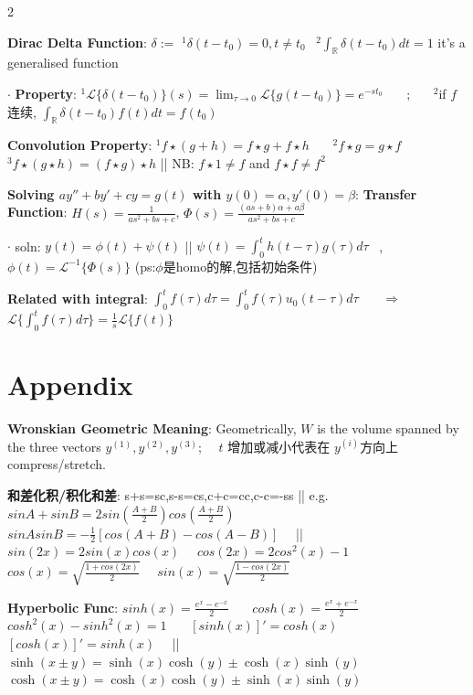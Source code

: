 \documentclass[8pt]{extarticle}
\begin{document}
\begin{multicols}{2}
{\textbf{Dirac Delta Function}: $\delta:=$ $^1\delta(t-t_0)=0,t\ne t_0$ \ $^2\int_{\mathbb{R}}\delta(t-t_0)dt=1$ {\tiny it's a generalised function}

$\cdot$ \textbf{Property}: $^1\mathcal{L}\{\delta(t-t_0)\}(s)=\lim_{\tau\to0}\mathcal{L}\{g(t-t_0)\}=e^{-st_0}$ \ \ \ ; \ \ \ $^2$if $f$连续, $\int_{\mathbb{R}}\delta(t-t_0)f(t)dt=f(t_0)$

\textbf{Convolution Property}: $^1f\star (g+h)=f\star g+f\star h$ \ \ \ $^2f\star g=g\star f$ \ \ \ $^3f\star (g\star h)=(f\star g)\star h$ || NB: $f\star 1\ne f$ and $f\star f\ne f^2$

\vspace{-2pt}
\textbf{Solving $ay''+by'+cy=g(t)$ with $y(0)=\alpha,y'(0)=\beta$}:  \textbf{Transfer Function}: $H(s)=\frac{1}{as^2+bs+c}$, $\Phi(s)=\frac{(as+b)\alpha+a\beta}{as^2+bs+c}$

$\cdot$ soln: $y(t)=\phi(t)+\psi(t)$ || $\psi(t)=\int_{0}^{t}h(t-\tau)g(\tau)d\tau$ \ , \ $\phi(t)=\mathcal{L}^{-1}\{\Phi(s)\}$ (ps:$\phi$是homo的解,包括初始条件)

\textbf{Related with integral}: $\int^t_0f(\tau)d\tau=\int_{0}^{t}f(\tau)u_{0}(t-\tau)d\tau$ \ \ \ $\Rightarrow$ \ \ \ $\mathcal{L}\{\int_{0}^{t}f(\tau)d\tau\}=\frac{1}{s}\mathcal{L}\{f(t)\}$

}
\end{multicols}
\vspace{-10pt}


\section{Appendix}

\scriptsize

\textbf{Wronskian Geometric Meaning}: Geometrically, $W$ is the volume spanned by the three vectors $y^{(1)}, y^{(2)}, y^{(3)}$; \ \ $t$ 增加或减小代表在 $y^{(i)}$方向上 compress/stretch.

\textbf{和差化积/积化和差}: s+s=sc,s-s=cs,c+c=cc,c-c=-ss || e.g. $sinA+sinB=2sin(\frac{A+B}{2})cos(\frac{A+B}{2})$ \ \ \ $sinAsinB=-\frac{1}{2}[cos(A+B)-cos(A-B)]$ \ \ || \ \ $sin(2x)=2sin(x)cos(x)$ \ \ $cos(2x)=2cos^2(x)-1$ \ \ $cos(x)=\sqrt{\frac{1+cos(2x)}{2}}$ \ \ $sin(x)=\sqrt{\frac{1-cos(2x)}{2}}$

\textbf{Hyperbolic Func}: $sinh(x)=\frac{e^x-e^{-x}}{2}$ \ \ \ $cosh(x)=\frac{e^x+e^{-x}}{2}$ \ \ \ $cosh^2(x)-sinh^2(x)=1$ \ \ \ $[sinh(x)]'=cosh(x)$ \ \ \ $[cosh(x)]'=sinh(x)$ \ \ || \ \ $\sinh(x \pm y) = \sinh(x)\cosh(y) \pm \cosh(x)\sinh(y)$ \ \ \ \ \ \ $\cosh(x \pm y) = \cosh(x)\cosh(y) \pm \sinh(x)\sinh(y)$
\end{document}
